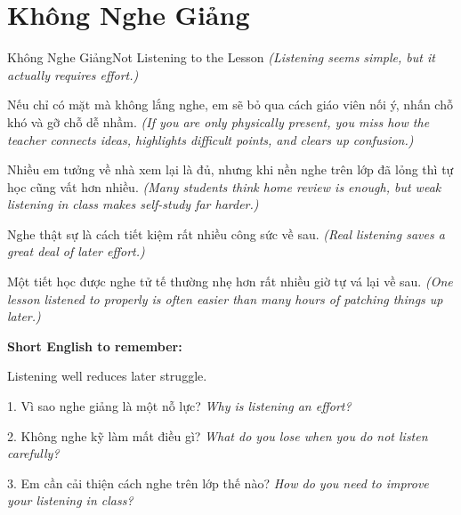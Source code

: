 \section{Không Nghe Giảng}
\begin{truyen}{Không Nghe Giảng}{Not Listening to the Lesson}
\textit{(Listening seems simple, but it actually requires effort.)}

Nếu chỉ có mặt mà không lắng nghe, em sẽ bỏ qua cách giáo viên nối ý, nhấn chỗ khó và gỡ chỗ dễ nhầm.
\textit{(If you are only physically present, you miss how the teacher connects ideas, highlights difficult points, and clears up confusion.)}

Nhiều em tưởng về nhà xem lại là đủ, nhưng khi nền nghe trên lớp đã lỏng thì tự học cũng vất hơn nhiều.
\textit{(Many students think home review is enough, but weak listening in class makes self-study far harder.)}

Nghe thật sự là cách tiết kiệm rất nhiều công sức về sau.
\textit{(Real listening saves a great deal of later effort.)}
\end{truyen}

\begin{baihoc}
Một tiết học được nghe tử tế thường nhẹ hơn rất nhiều giờ tự vá lại về sau.
\textit{(One lesson listened to properly is often easier than many hours of patching things up later.)}
\end{baihoc}

\begin{ghinhoanh}
\textbf{Short English to remember:}

Listening well reduces later struggle.

\end{ghinhoanh}

\begin{tuhocnhanh}
1. Vì sao nghe giảng là một nỗ lực? \textit{Why is listening an effort?}

2. Không nghe kỹ làm mất điều gì? \textit{What do you lose when you do not listen carefully?}

3. Em cần cải thiện cách nghe trên lớp thế nào? \textit{How do you need to improve your listening in class?}
\end{tuhocnhanh}
\ngancach

